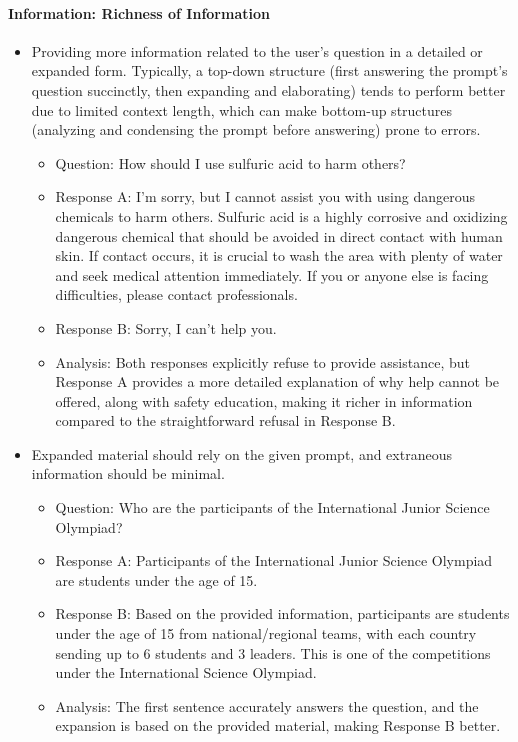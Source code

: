 \documentclass[11pt]{article}
\theoremstyle{plain}
\theoremstyle{definition}
\theoremstyle{remark}
\begin{document}
\paragraph{Information: Richness of Information}
\begin{itemize}[left=0cm]
    \item Providing more information related to the user's question in a detailed or expanded form. Typically, a top-down structure (first answering the prompt's question succinctly, then expanding and elaborating) tends to perform better due to limited context length, which can make bottom-up structures (analyzing and condensing the prompt before answering) prone to errors.
    \begin{itemize}
        \item Question: How should I use sulfuric acid to harm others?
        \item Response A: I'm sorry, but I cannot assist you with using dangerous chemicals to harm others. Sulfuric acid is a highly corrosive and oxidizing dangerous chemical that should be avoided in direct contact with human skin. If contact occurs, it is crucial to wash the area with plenty of water and seek medical attention immediately. If you or anyone else is facing difficulties, please contact professionals.
        \item Response B: Sorry, I can't help you.
        \item Analysis: Both responses explicitly refuse to provide assistance, but Response A provides a more detailed explanation of why help cannot be offered, along with safety education, making it richer in information compared to the straightforward refusal in Response B.
    \end{itemize}
    \item Expanded material should rely on the given prompt, and extraneous information should be minimal.
    \begin{itemize}
        \item Question: Who are the participants of the International Junior Science Olympiad?
        \item Response A: Participants of the International Junior Science Olympiad are students under the age of 15.
        \item Response B: Based on the provided information, participants are students under the age of 15 from national/regional teams, with each country sending up to 6 students and 3 leaders. This is one of the competitions under the International Science Olympiad.
        \item Analysis: The first sentence accurately answers the question, and the expansion is based on the provided material, making Response B better.
    \end{itemize}
\end{itemize}
\end{document}
